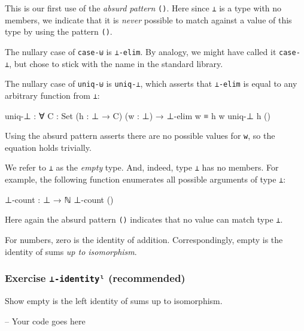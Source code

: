 This is our first use of the \emph{absurd pattern} \texttt{()}. Here
since \texttt{⊥} is a type with no members, we indicate that it is
\emph{never} possible to match against a value of this type by using the
pattern \texttt{()}.

The nullary case of \texttt{case-⊎} is \texttt{⊥-elim}. By analogy, we
might have called it \texttt{case-⊥}, but chose to stick with the name
in the standard library.

The nullary case of \texttt{uniq-⊎} is \texttt{uniq-⊥}, which asserts
that \texttt{⊥-elim} is equal to any arbitrary function from \texttt{⊥}:

\begin{fence}
\begin{code}
uniq-⊥ : ∀ {C : Set} (h : ⊥ → C) (w : ⊥) → ⊥-elim w ≡ h w
uniq-⊥ h ()
\end{code}
\end{fence}

Using the absurd pattern asserts there are no possible values for
\texttt{w}, so the equation holds trivially.

We refer to \texttt{⊥} as the \emph{empty} type. And, indeed, type
\texttt{⊥} has no members. For example, the following function
enumerates all possible arguments of type \texttt{⊥}:

\begin{fence}
\begin{code}
⊥-count : ⊥ → ℕ
⊥-count ()
\end{code}
\end{fence}

Here again the absurd pattern \texttt{()} indicates that no value can
match type \texttt{⊥}.

For numbers, zero is the identity of addition. Correspondingly, empty is
the identity of sums \emph{up to isomorphism}.

\hypertarget{exercise--identityux2e1-recommended}{%
\subsubsection{\texorpdfstring{Exercise \texttt{⊥-identityˡ}
(recommended)}{Exercise ⊥-identityˡ (recommended)}}\label{exercise--identityux2e1-recommended}}

Show empty is the left identity of sums up to isomorphism.

\begin{fence}
\begin{code}
-- Your code goes here
\end{code}
\end{fence}

